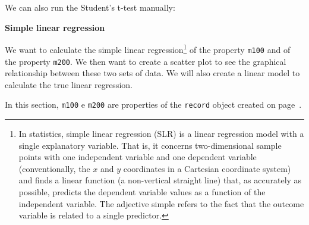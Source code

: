 \documentclass[a4paper]{article}
\newcommand{\highspace}{\vspace{1.2em}\noindent}
\begin{document}
    \newpage
    
    
    We can also run the Student's t-test manually:
    

    \newpage

    \begin{flushleft}
        \large
        \textbf{Simple linear regression}
    \end{flushleft}
    We want to calculate the simple linear regression\footnote{In statistics, simple linear regression (SLR) is a linear regression model with a single explanatory variable. That is, it concerns two-dimensional sample points with one independent variable and one dependent variable (conventionally, the $x$ and $y$ coordinates in a Cartesian coordinate system) and finds a linear function (a non-vertical straight line) that, as accurately as possible, predicts the dependent variable values as a function of the independent variable. The adjective simple refers to the fact that the outcome variable is related to a single predictor.} of the property \texttt{m100} and of the property \texttt{m200}. We then want to create a scatter plot to see the graphical relationship between these two sets of data. We will also create a linear model to calculate the true linear regression.

    \highspace
    In this section, \texttt{m100} e \texttt{m200} are properties of the \texttt{record} object created on page~\pageref{code: read.table - modded}.
\end{document}
